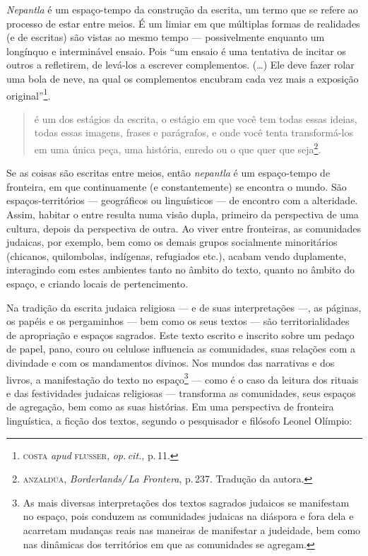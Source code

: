 \emph{Nepantla} é um espaço-tempo da construção da escrita, um termo que
se refere ao processo de estar entre meios. É um limiar em que múltiplas
formas de realidades (e de escritas) são vistas ao mesmo tempo ---
possivelmente enquanto um longínquo e interminável ensaio. Pois
``um ensaio é uma tentativa de incitar os outros a refletirem, de
levá-los a escrever complementos. (\ldots{}) Ele deve fazer rolar uma bola de
neve, na qual os complementos encubram cada vez mais a exposição
original''\footnote{\textsc{costa} \emph{apud} \textsc{flusser}, \emph{op.\,cit.}, p.\,11.}.

\begin{quote}
é um dos estágios da escrita, o estágio em que você tem todas essas
ideias, todas essas imagens, frases e parágrafos, e onde você tenta
transformá-los em uma única peça, uma história, enredo ou o que quer que
seja\footnote{\textsc{anzaldúa}, \emph{Borderlands/\,La Frontera}, p.\,237. Tradução da autora.}.
\end{quote}

Se as coisas são escritas entre meios, então \emph{nepantla} é um
espaço-tempo de fronteira, em que continuamente (e constantemente) se
encontra o mundo. São espaços-territórios --- geográficos ou
linguísticos --- de encontro com a alteridade. Assim, habitar o entre
resulta numa visão dupla, primeiro da perspectiva de uma cultura, depois
da perspectiva de outra. Ao viver entre fronteiras, as comunidades
judaicas, por exemplo, bem como os demais grupos socialmente
minoritários (chicanos, quilombolas, indígenas, refugiados etc.), acabam
vendo duplamente, interagindo com estes ambientes tanto no âmbito do
texto, quanto no âmbito do espaço, e criando locais de pertencimento.

\begin{center}\end{center}

\noindent{}Na tradição da escrita judaica religiosa --- e de suas interpretações
---, as páginas, os papéis e os pergaminhos --- bem como os seus textos
--- são territorialidades de apropriação e espaços sagrados. Este texto
escrito e inscrito sobre um pedaço de papel, pano, couro ou celulose
influencia as comunidades, suas relações com a divindade e com os
mandamentos divinos. Nos mundos das narrativas e dos livros, a
manifestação do texto no espaço\footnote{As mais diversas interpretações
  dos textos sagrados judaicos se manifestam no espaço, pois conduzem as
  comunidades judaicas na diáspora e fora dela e acarretam mudanças
  reais nas maneiras de manifestar a judeidade, bem como nas dinâmicas
  dos territórios em que as comunidades se agregam.} --- como é o caso
da leitura dos rituais e das festividades judaicas religiosas ---
transforma as comunidades, seus espaços de agregação, bem como as suas
histórias. Em uma perspectiva de fronteira linguística, a ficção dos
textos, segundo o pesquisador e filósofo Leonel Olímpio:


